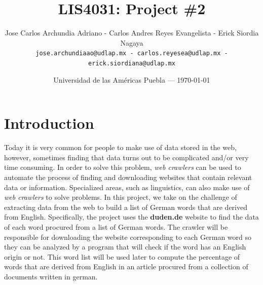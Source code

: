 \documentclass{article}
\title{LIS4031: Project \#2} %
\author{Jose Carlos Archundia Adriano - Carlos Andres Reyes Evangelista - Erick Siordia Nagaya\\ \texttt{jose.archundiaao@udlap.mx - carlos.reyesea@udlap.mx - erick.siordiana@udlap.mx}} %
\date{Universidad de las Am\'ericas  Puebla --- \today} %
\begin{document}
\maketitle %

\section{Introduction} %
Today it is very common for people to make use of data stored in the web, however, sometimes finding that data turns out to be complicated and/or very time consuming. In order to solve this problem, \textit{web crawlers} can be used to automate the process of finding and downloading websites that contain relevant data or information.
Specialized areas, such as linguistics, can also make use of \textit{web crawlers} to solve problems.
In this project, we take on the challenge of extracting data from the web to build a list of German words that are derived from English. Specifically, the project uses the \textbf{duden.de} website to find the data of each word procured from a list of German words. The crawler will be responsible for downloading the website corresponding to each German word so they can be analyzed by a program that will check if the word has an English origin or not. This word list will be used later to compute the percentage of words that are derived from English in an article procured from a collection of documents written in german.
\end{document}
